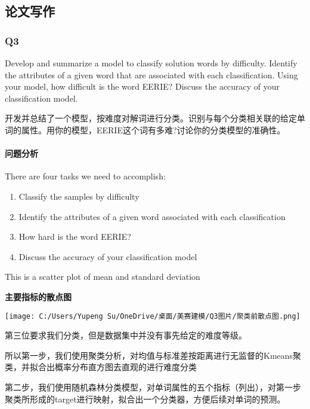 \documentclass[
]{article}
\author{}
\date{}
\begin{document}
\hypertarget{ux8bbaux6587ux5199ux4f5c}{%
\subsection{论文写作}\label{ux8bbaux6587ux5199ux4f5c}}

\hypertarget{q3}{%
\subsubsection{Q3}\label{q3}}

Develop and summarize a model to classify solution words by difficulty.
Identify the attributes of a given word that are associated with each
classification. Using your model, how difficult is the word EERIE?
Discuss the accuracy of your classification model.

开发并总结了一个模型，按难度对解词进行分类。识别与每个分类相关联的给定单词的属性。用你的模型，EERIE这个词有多难?讨论你的分类模型的准确性。

\hypertarget{ux95eeux9898ux5206ux6790}{%
\paragraph{问题分析}\label{ux95eeux9898ux5206ux6790}}

There are four tasks we need to accomplish:

\begin{enumerate}
\def\labelenumi{\arabic{enumi}.}
\item
  Classify the samples by difficulty
\item
  Identify the attributes of a given word associated with each
  classification
\item
  How hard is the word EERIE?
\item
  Discuss the accuracy of your classification model
\end{enumerate}

This is a scatter plot of mean and standard deviation

\textbf{主要指标的散点图}

\texttt{[image: C:/Users/Yupeng Su/OneDrive/桌面/美赛建模/Q3图片/聚类前散点图.png]}

第三位要求我们分类，但是数据集中并没有事先给定的难度等级。

所以第一步，我们使用聚类分析，对均值与标准差按距离进行无监督的Kmeans聚类，并拟合出概率分布直方图去直观的进行难度分类

第二步，我们使用随机森林分类模型，对单词属性的五个指标（列出），对第一步聚类所形成的target进行映射，拟合出一个分类器，方便后续对单词的预测。
\end{document}
